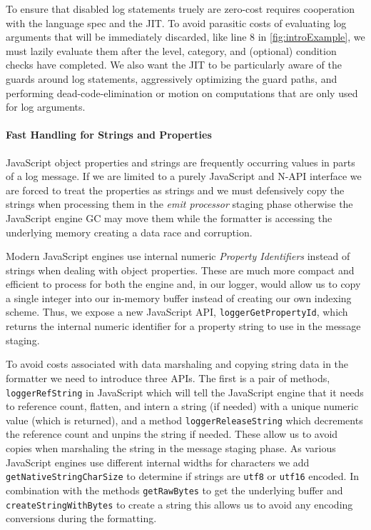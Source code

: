 To ensure that disabled log statements truely are zero-cost requires cooperation 
with the language spec and the JIT. To avoid parasitic costs of evaluating log 
arguments that will be immediately discarded, like line 8 in \autoref{fig:introExample}, 
we must lazily evaluate them after the level, category, and (optional) condition 
checks have completed. We also want the JIT to be particularly aware of the guards 
around log statements, aggressively optimizing the guard paths, and performing 
dead-code-elimination or motion on computations that are only used for log arguments.

\paragraph{Fast Handling for Strings and Properties}
\noindent
JavaScript object properties and strings are frequently occurring values in 
parts of a log message. If we are limited to a purely JavaScript and N-API 
interface we are forced to treat the properties as strings and we must 
defensively copy the strings when processing them in the \emph{emit processor} staging 
phase otherwise the JavaScript engine GC may move them while the formatter is 
accessing the underlying memory creating a data race and corruption. 

Modern JavaScript engines use internal numeric \emph{Property Identifiers} 
instead of strings when dealing with object properties. These are much more 
compact and efficient to process for both the engine and, in our logger, would 
allow us to copy a single integer into our in-memory buffer instead of creating 
our own indexing scheme. Thus, we expose a new 
JavaScript API, \texttt{loggerGetPropertyId}, which returns the 
internal numeric identifier for a property string to use in the message staging. 

To avoid costs associated with data marshaling and copying string data 
in the formatter we need to introduce three APIs. The first is a pair of 
methods, \texttt{loggerRefString} in JavaScript which will tell the JavaScript 
engine that it needs to reference count, flatten, and intern a string (if needed) 
with a unique numeric value (which is returned), and a method \texttt{loggerReleaseString} 
which decrements the reference count and unpins the string if needed. These 
allow us to avoid copies when marshaling the string in the message staging 
phase. As various JavaScript engines use different internal widths for characters 
we add \texttt{getNativeStringCharSize} to determine if strings 
are \texttt{utf8} or \texttt{utf16} encoded. In combination with the methods \texttt{getRawBytes} 
to get the underlying buffer and \texttt{createStringWithBytes} to create a string this allows us to avoid any encoding 
conversions during the formatting. 

